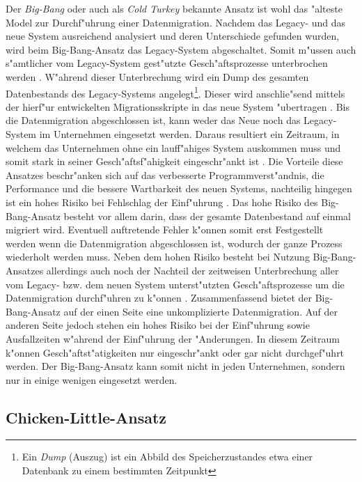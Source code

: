 Der \textit{Big-Bang} oder auch als \textit{Cold Turkey} bekannte Ansatz ist wohl das "alteste Model zur Durchf"uhrung einer Datenmigration. Nachdem das Legacy- und das neue System ausreichend analysiert und deren Unterschiede gefunden wurden, wird beim Big-Bang-Ansatz das Legacy-System abgeschaltet. Somit m"ussen auch s"amtlicher vom Legacy-System gest"utzte Gesch"aftsprozesse unterbrochen werden \citep[S.~4]{wuLawless-1997}. 
\lb
W"ahrend dieser Unterbrechung wird ein Dump des gesamten Datenbestands des Legacy-Systems angelegt\footnote{Ein \textit{Dump} (Auszug) ist ein Abbild des Speicherzustandes etwa einer Datenbank zu einem bestimmten Zeitpunkt}. Dieser wird anschlie"send mittels der hierf"ur entwickelten Migrationsskripte in das neue System "ubertragen \citep[S.~3]{brodie-1993}. Bis die Datenmigration abgeschlossen ist, kann weder das Neue noch das Legacy-System im Unternehmen eingesetzt werden. Daraus resultiert ein Zeitraum, in welchem das Unternehmen ohne ein lauff"ahiges System auskommen muss und somit stark in seiner Gesch"aftsf"ahigkeit eingeschr"ankt ist \citep[S.~3f.]{brodie-1993}.
\lb
Die Vorteile diese Ansatzes beschr"anken sich auf das verbesserte Programmverst"andnis, die Performance und die bessere Wartbarkeit des neuen Systems, nachteilig hingegen ist ein hohes Risiko bei Fehlschlag der Einf"uhrung \citep[S.~105]{bisbal-1999}. Das hohe Risiko des Big-Bang-Ansatz besteht vor allem darin, dass der gesamte Datenbestand auf einmal migriert wird. Eventuell auftretende Fehler k"onnen somit erst Festgestellt werden wenn die Datenmigration abgeschlossen ist, wodurch der ganze Prozess wiederholt werden muss. Neben dem hohen Risiko besteht bei Nutzung Big-Bang-Ansatzes allerdings auch noch der Nachteil der zeitweisen Unterbrechung aller vom Legacy- bzw. dem neuen System unterst"utzten Gesch"aftsprozesse um die Datenmigration durchf"uhren zu k"onnen \citep[S.~4]{wuLawless-1997}.
\lb
Zusammenfassend bietet der Big-Bang-Ansatz auf der einen Seite eine unkomplizierte Datenmigration. Auf der anderen Seite jedoch stehen ein hohes Risiko bei der Einf"uhrung sowie Ausfallzeiten w"ahrend der Einf"uhrung der "Anderungen. In diesem Zeitraum k"onnen Gesch"aftst"atigkeiten nur eingeschr"ankt oder gar nicht durchgef"uhrt werden. Der Big-Bang-Ansatz kann somit nicht in jeden Unternehmen, sondern nur in einige wenigen eingesetzt werden. 

\subsection{Chicken-Little-Ansatz}

